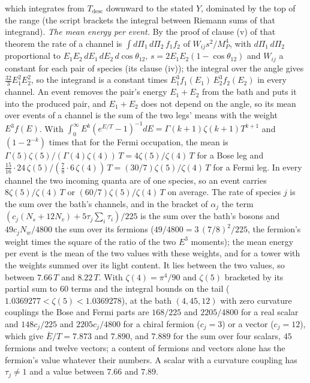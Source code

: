 which integrates from $T_{\mathrm{desc}}$ downward to the stated $Y$, dominated by the top of the range (the script brackets the integral between Riemann sums of that integrand). \emph{The mean energy per event.} By the proof of clause (v) of that theorem the rate of a channel is $\int d\Pi_{1}\,d\Pi_{2}\,f_{1}f_{2}$ of $W_{ij}s^{2}/M_{P}^{4}$, with $d\Pi_{1}\,d\Pi_{2}$ proportional to $E_{1}E_{2}\,dE_{1}\,dE_{2}\,d\cos\theta_{12}$, $s = 2E_{1}E_{2}(1 - \cos\theta_{12})$ and $W_{ij}$ a constant for each pair of species (its clause (iv)); the integral over the angle gives $\tfrac{32}{3}E_{1}^{2}E_{2}^{2}$, so the integrand is a constant times $E_{1}^{3}f_{1}(E_{1})\,E_{2}^{3}f_{2}(E_{2})$ in every channel. An event removes the pair's energy $E_{1} + E_{2}$ from the bath and puts it into the produced pair, and $E_{1} + E_{2}$ does not depend on the angle, so its mean over events of a channel is the sum of the two legs' means with the weight $E^{3}f(E)$. With $\int_{0}^{\infty}E^{k}(e^{E/T} - 1)^{-1}dE = \Gamma(k+1)\zeta(k+1)T^{k+1}$ and $(1 - 2^{-k})$ times that for the Fermi occupation, the mean is $\Gamma(5)\zeta(5)/(\Gamma(4)\zeta(4))\,T = 4\zeta(5)/\zeta(4)\,T$ for a Bose leg and $\tfrac{15}{16}\cdot 24\,\zeta(5)/(\tfrac78 \cdot 6\,\zeta(4))\,T = (30/7)\zeta(5)/\zeta(4)\,T$ for a Fermi leg. In every channel the two incoming quanta are of one species, so an event carries $8\zeta(5)/\zeta(4)\,T$ or $(60/7)\zeta(5)/\zeta(4)\,T$ on average. The rate of species $j$ is the sum over the bath's channels, and in the bracket of $\alpha_{j}$ the term $(c_{j}(N_{s} + 12N_{v}) + 5\tau_{j}\sum_{i}\tau_{i})/225$ is the sum over the bath's bosons and $49c_{j}N_{w}/4800$ the sum over its fermions ($49/4800 = 3\,(7/8)^{2}/225$, the fermion's weight times the square of the ratio of the two $E^{3}$ moments); the mean energy per event is the mean of the two values with these weights, and for a tower with the weights summed over its light content. It lies between the two values, so between $7.66\,T$ and $8.22\,T$. With $\zeta(4) = \pi^{4}/90$ and $\zeta(5)$ bracketed by its partial sum to $60$ terms and the integral bounds on the tail ($1.0369277 < \zeta(5) < 1.0369278$), at the bath $(4, 45, 12)$ with zero curvature couplings the Bose and Fermi parts are $168/225$ and $2205/4800$ for a real scalar and $148c_{j}/225$ and $2205c_{j}/4800$ for a chiral fermion ($c_{j} = 3$) or a vector ($c_{j} = 12$), which give $\bar{E}/T = 7.873$ and $7.890$, and $7.889$ for the sum over four scalars, $45$ fermions and twelve vectors; a content of fermions and vectors alone has the fermion's value whatever their numbers. A scalar with a curvature coupling has $\tau_{j} \neq 1$ and a value between $7.66$ and $7.89$.

